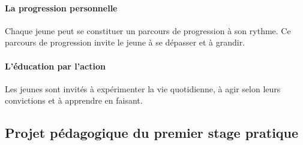 \documentclass[titlepage,11pt,a4paper]{article}
\begin{document}
\paragraph{La progression personnelle} Chaque jeune peut se constituer un parcours
de progression à son rythme. Ce parcours de progression invite le jeune à se dépasser et à
grandir.

\paragraph{L'éducation par l'action} Les jeunes sont invités à expérimenter la vie
quotidienne, à agir selon leurs convictions et à apprendre en faisant.

\clearpage
\subsection{Projet pédagogique du premier stage pratique}
\end{document}
